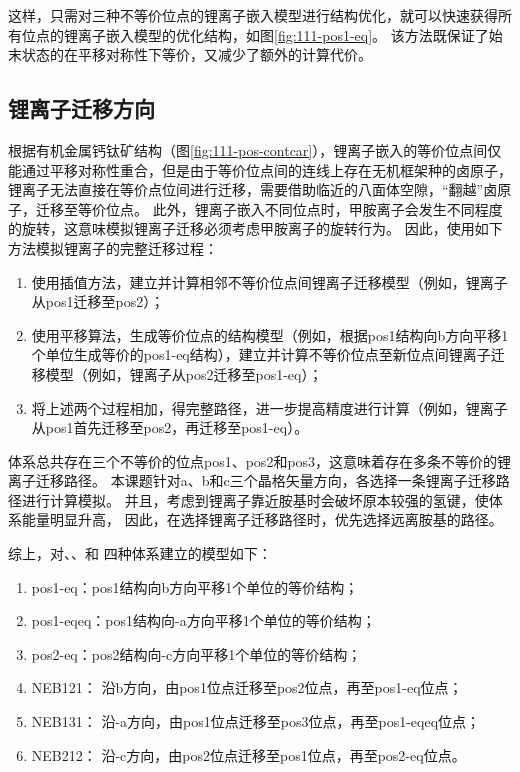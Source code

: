 这样，只需对三种不等价位点的锂离子嵌入模型进行结构优化，就可以快速获得所有位点的锂离子嵌入模型的优化结构，如图\ref{fig:111-pos1-eq}。
该方法既保证了始末状态的在平移对称性下等价，又减少了额外的计算代价。

\subsection{锂离子迁移方向}

根据有机金属钙钛矿结构（图\ref{fig:111-pos-contcar}），锂离子嵌入的等价位点间仅能通过平移对称性重合，但是由于等价位点间的连线上存在无机框架种的卤原子，锂离子无法直接在等价点位间进行迁移，需要借助临近的八面体空隙，“翻越”卤原子，迁移至等价位点。
此外，锂离子嵌入不同位点时，甲胺离子会发生不同程度的旋转，这意味模拟锂离子迁移必须考虑甲胺离子的旋转行为。
因此，使用如下方法模拟锂离子的完整迁移过程：
\begin{enumerate}
    \item 使用插值方法，建立并计算相邻不等价位点间锂离子迁移模型（例如，锂离子从pos1迁移至pos2）；
    \item 使用平移算法，生成等价位点的结构模型（例如，根据pos1结构向b方向平移1个单位生成等价的pos1-eq结构），建立并计算不等价位点至新位点间锂离子迁移模型（例如，锂离子从pos2迁移至pos1-eq）；
    \item 将上述两个过程相加，得完整路径，进一步提高精度进行计算（例如，锂离子从pos1首先迁移至pos2，再迁移至pos1-eq）。
\end{enumerate}


体系总共存在三个不等价的位点pos1、pos2和pos3，这意味着存在多条不等价的锂离子迁移路径。
本课题针对a、b和c三个晶格矢量方向，各选择一条锂离子迁移路径进行计算模拟。
并且，考虑到锂离子靠近胺基时会破坏原本较强的氢键，使体系能量明显升高，
因此，在选择锂离子迁移路径时，优先选择远离胺基的路径。


综上，对、、和 四种体系建立的模型如下：
\begin{enumerate}
    \item pos1-eq：pos1结构向b方向平移1个单位的等价结构；
    \item pos1-eqeq：pos1结构向-a方向平移1个单位的等价结构；
    \item pos2-eq：pos2结构向-c方向平移1个单位的等价结构；
    \item NEB121： 沿b方向，由pos1位点迁移至pos2位点，再至pos1-eq位点；
    \item NEB131： 沿-a方向，由pos1位点迁移至pos3位点，再至pos1-eqeq位点；
    \item NEB212： 沿-c方向，由pos2位点迁移至pos1位点，再至pos2-eq位点。
\end{enumerate}

